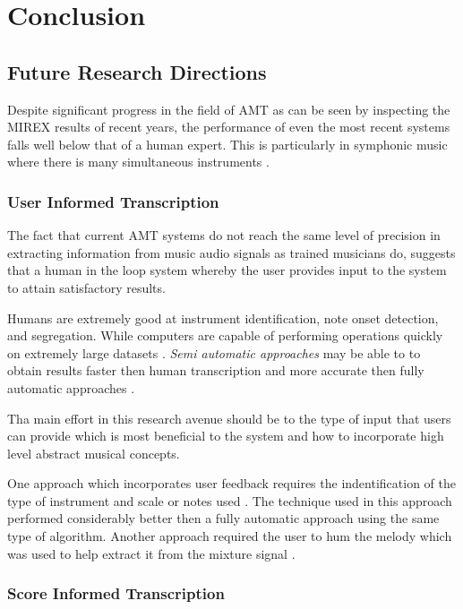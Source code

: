 \chapter{Conclusion}
\label{ch:concl}

\section{Future Research Directions}

Despite significant progress in the field of \ac{AMT} as can be seen by inspecting
the \ac{MIREX} results \cite{MIREX} of recent years, the performance of even the most
recent systems falls well below that of a human expert. This is particularly in symphonic
music where there is many simultaneous instruments \cite{roadmap-MIR:Serra2013}.

\subsection{User Informed Transcription}

The fact that current \ac{AMT} systems do not reach the same level of precision in
extracting information from music audio signals as trained musicians do,
suggests that a human in the loop system whereby the user provides input to the
system to attain satisfactory results.

Humans are extremely good at instrument identification, note onset detection,
and segregation. While computers are capable of performing operations quickly on
extremely large datasets \cite{ISMIR-tut:Benetos}. \emph{Semi automatic
    approaches} may be able to to obtain results faster then human transcription and
more accurate then fully automatic approaches \cite{ISMIR-tut:Benetos}.

Tha main effort in this research avenue should be to the type of input that
users can provide which is most beneficial to the system and how to incorporate
high level abstract musical concepts.

One approach which incorporates user feedback requires the indentification of
the type of instrument and scale or notes used \cite{user-inform:Kirchoff2012}.
The technique used in this approach performed considerably better then a fully
automatic approach using the same type of algorithm. Another approach required
the user to hum the melody which was used to help extract it from the mixture
signal \cite{humming2009:Smaragdis}.

\subsection{Score Informed Transcription}

